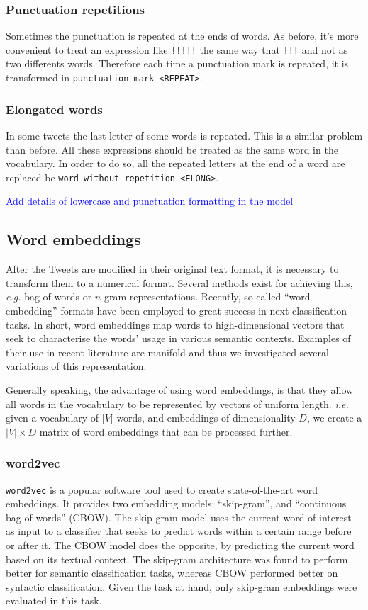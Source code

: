 \subsubsection{Punctuation repetitions}
Sometimes the punctuation is repeated at the ends of words. As before, it's more convenient to treat an expression like \texttt{!!!!!} the same way that \texttt{!!!} and not as two differents words. Therefore each time a punctuation mark is repeated, it is transformed in \texttt{punctuation mark <REPEAT>}. 

\subsubsection{Elongated words}
In some tweets the last letter of some words is repeated. This is a similar problem than before. All these expressions should be treated as the same word in the vocabulary. In order to do so, all the repeated letters at the end of a word are replaced be \texttt{word without repetition <ELONG>}.

\textcolor{blue}{Add details of lowercase and punctuation formatting in the model}

\subsection{Word embeddings}
After the Tweets are modified in their original text format, it is necessary to transform them to a numerical format. Several methods exist for achieving this, \emph{e.g.} bag of words or $n$-gram representations. Recently, so-called ``word embedding'' formats \cite{} have been employed to great success in next classification tasks. In short, word embeddings map words to high-dimensional vectors that seek to characterise the words' usage in various semantic contexts. \cite{} Examples of their use in recent literature are manifold \cite{} and thus we investigated several variations of this representation.

Generally speaking, the advantage of using word embeddings, is that they allow all words in the vocabulary to be represented by vectors of uniform length. \emph{i.e.} given a vocabulary of $|V|$ words, and embeddings of dimensionality $D$, we create a $|V| \times D$ matrix of word embeddings that can be processed further.

\subsubsection{word2vec}
\texttt{word2vec} is a popular software tool used to create state-of-the-art word embeddings. \cite{mikolov2013distributed} It provides two embedding models: ``skip-gram'', and ``continuous bag of words'' (CBOW). The skip-gram model uses the current word of interest as input to a classifier that seeks to predict words within a certain range before or after it. The CBOW model does the opposite, by predicting the current word based on its textual context. The skip-gram architecture was found to perform better for semantic classification tasks, whereas CBOW performed better on syntactic classification. \cite{mikolov2013efficient} Given the task at hand, only skip-gram embeddings were evaluated in this task.

